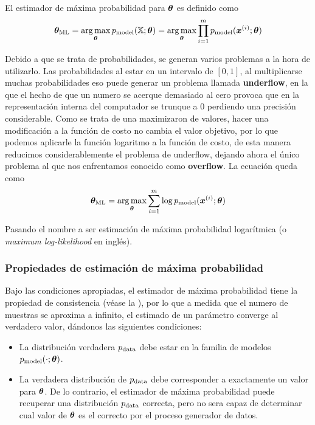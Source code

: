 El estimador de máxima probabilidad para ${\bm{\theta}}$ es definido como
\begin{equation}
  {\bm{\theta}}_{\mathrm{ML}} = \operatorname*{arg\,max}_{{\bm{\theta}}} p_{\rm{model}}({\mathbb{X}}; {\bm{\theta}}) = \operatorname*{arg\,max}_{{\bm{\theta}}} \prod_{i=1}^{m} p_{\rm{model}}({\bm{x}}^{(i)}; {\bm{\theta}})
\end{equation}

Debido a que se trata de probabilidades, se generan varios problemas a la hora de utilizarlo. Las probabilidades al estar en un intervalo de $[0, 1]$, al multiplicarse muchas probabilidades eso puede generar un problema llamada \textbf{underflow}, en la que el hecho de que un numero se acerque demasiado al cero provoca que en la representación interna del computador se trunque a $0$ perdiendo una precisión considerable. Como se trata de una maximizaron de valores, hacer una modificación a la función de costo no cambia el valor objetivo, por lo que podemos aplicarle la función logaritmo a la función de costo, de esta manera reducimos considerablemente el problema de underflow, dejando ahora el único problema al que nos enfrentamos conocido como \textbf{overflow}. La ecuación queda como
\begin{equation}
  {\bm{\theta}}_{\mathrm{ML}} = \operatorname*{arg\,max}_{{\bm{\theta}}} \sum_{i=1}^{m} \log p_{\rm{model}}({\bm{x}}^{(i)}; {\bm{\theta}})
\end{equation}

Pasando el nombre a ser estimación de máxima probabilidad logarítmica (o \textsl{maximum log-likelihood} en inglés).

\subsubsection{Propiedades de estimación de máxima probabilidad}
Bajo las condiciones apropiadas, el estimador de máxima probabilidad tiene la propiedad de consistencia (véase la ), por lo que a medida que el numero de muestras se aproxima a infinito, el estimado de un parámetro converge al verdadero valor, dándonos las siguientes condiciones:
\begin{itemize}
\item La distribución verdadera $p_{\rm{data}}$ debe estar en la familia de modelos $p_{\rm{model}}(\cdot; {\bm{\theta}})$.
  \item La verdadera distribución de $p_{\rm{data}}$ debe corresponder a exactamente un valor para ${\bm{\theta}}$. De lo contrario, el estimador de máxima probabilidad puede recuperar una distribución $p_{\rm{data}}$ correcta, pero no sera capaz de determinar cual valor de ${\bm{\theta}}$ es el correcto por el proceso generador de datos.
\end{itemize}

